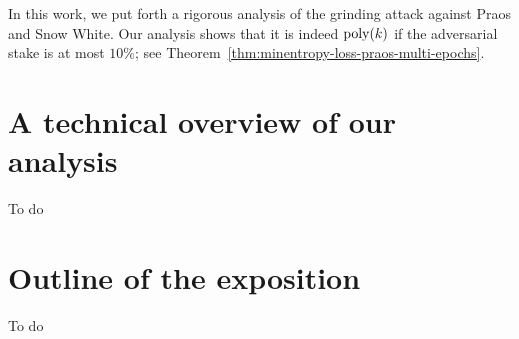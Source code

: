 In this work, we put forth a rigorous analysis of the grinding attack against Praos and Snow White. 
Our analysis shows that it is indeed $\mathrm{poly}(k)$ if the adversarial stake is at most $10\%$; 
see Theorem~\ref{thm:minentropy-loss-praos-multi-epochs}.








\section{A technical overview of our analysis}
To do


\section{Outline of the exposition}
To do

